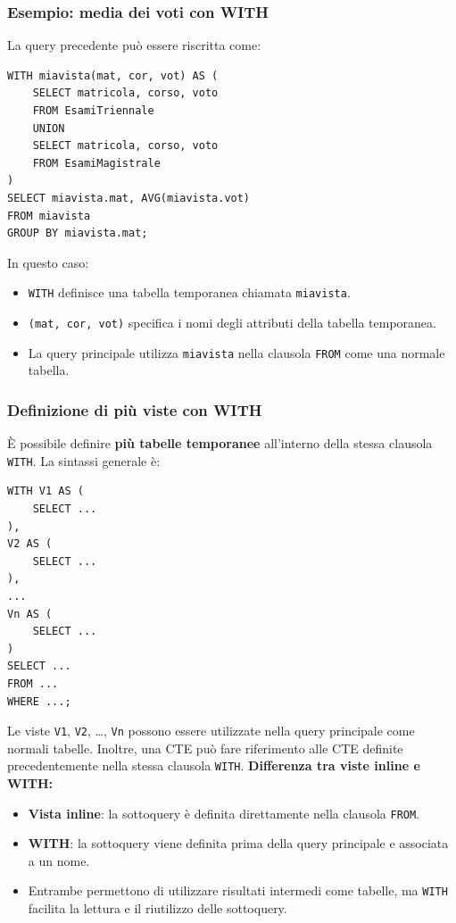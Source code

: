 \subsubsection*{Esempio: media dei voti con WITH}
La query precedente può essere riscritta come:
\begin{verbatim}
WITH miavista(mat, cor, vot) AS (
    SELECT matricola, corso, voto
    FROM EsamiTriennale
    UNION
    SELECT matricola, corso, voto
    FROM EsamiMagistrale
)
SELECT miavista.mat, AVG(miavista.vot)
FROM miavista
GROUP BY miavista.mat;
\end{verbatim}
In questo caso:
\begin{itemize}
    \item \texttt{WITH} definisce una tabella temporanea
    chiamata \texttt{miavista}.
    
    \item \texttt{(mat, cor, vot)} specifica i nomi
    degli attributi della tabella temporanea.
    
    \item La query principale utilizza \texttt{miavista}
    nella clausola \texttt{FROM} come una normale tabella.
\end{itemize}

\subsubsection*{Definizione di più viste con WITH}
È possibile definire \textbf{più tabelle temporanee}
all'interno della stessa clausola \texttt{WITH}.
La sintassi generale è:
\begin{verbatim}
WITH V1 AS (
    SELECT ...
),
V2 AS (
    SELECT ...
),
...
Vn AS (
    SELECT ...
)
SELECT ...
FROM ...
WHERE ...;
\end{verbatim}
Le viste \texttt{V1}, \texttt{V2}, \ldots, \texttt{Vn}
possono essere utilizzate nella query principale
come normali tabelle.
Inoltre, una CTE può fare riferimento alle CTE
definite precedentemente nella stessa clausola
\texttt{WITH}.
\medskip
\noindent
\textbf{Differenza tra viste inline e WITH:}
\begin{itemize}
    \item \textbf{Vista inline}: la sottoquery è definita
    direttamente nella clausola \texttt{FROM}.
    
    \item \textbf{WITH}: la sottoquery viene definita
    prima della query principale e associata a un nome.
    
    \item Entrambe permettono di utilizzare risultati
    intermedi come tabelle, ma \texttt{WITH} facilita
    la lettura e il riutilizzo delle sottoquery.
\end{itemize}
